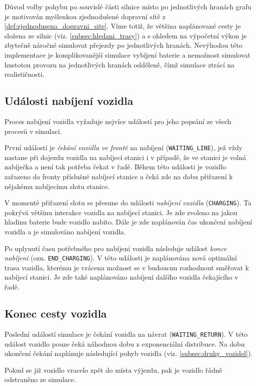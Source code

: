 Důvod volby pohybu po souvislé části silnice místo po jednotlivých hranách grafu
je motivován myšlenkou zjednodušené dopravní sítě 
z \cref{def:zjednodusena_dopravni_site}. Víme totiž, že většina naplánované cesty
je složena ze silnic (viz. \cref{subsec:hledani_trasy}) 
a s ohledem na výpočetní výkon je zbytečně náročné 
simulovat přejezdy po jednotlivých hranách. 
Nevýhodou této implementace je komplikovanější simulace vybíjení baterie a 
nemožnost simulovat hustotou provozu na jednotlivých hranách odděleně, čímž simulace 
ztrácí na realističnosti.


\subsection{Události nabíjení vozidla}
Proces nabíjení vozidla vyžaduje nejvíce událostí pro jeho popsání 
ze všech procesů v simulaci.

První událostí je \emph{čekání vozidla ve frontě} na nabíjení 
(\texttt{WAITING\_LINE}), jež vždy nastane při dojezdu vozidla na nabíjecí
stanici i v případě, že ve stanici je volná nabíječka a není tak potřeba čekat
v řadě. Během této události je vozidlo zařazeno do fronty příslušné nabíjecí 
stanice a čeká zde na dobu přiřazení k nějakému nabíjecímu slotu stanice.

V momentě přiřazení slotu se přesune do události \emph{nabíjení vozidla}
(\texttt{CHARGING}). Ta pokrývá většinu interakce vozidla na 
nabíjecí stanici. Je zde zvoleno na jakou hladinu baterie bude vozidlo nabito.
Dále je zde naplánován čas ukončení nabíjení vozidla a je simulováno 
nabíjení vozidla.

Po uplynutí času potřebného pro nabíjení vozidla následuje 
událost \emph{konce nabíjení} (ozn. \texttt{END\_CHARGING}).
V této události je naplánována nová optimální trasa vozidla, kterému je vrácena
možnost se v budoucnu rozhodnout směřovat k nabíjecí stanici. Je zde také
naplánováno nabíjení dalšího vozidla čekajícího v řadě.

\subsection{Konec cesty vozidla}

Poslední událostí simulace je čekání vozidla na návrat (\texttt{WAITING\_RETURN}).
V této událost vozidlo pouze čeká náhodnou dobu z exponenciální distribuce.
Na dobu ukončení čekání naplánuje následující pohyb vozidla 
(viz. \cref{subsec:druhy_vozidel}). 

Pokud se již vozidlo vracelo zpět do místa výjezdu, pak je vozidlo řádně
odstraněno ze simulace. 


